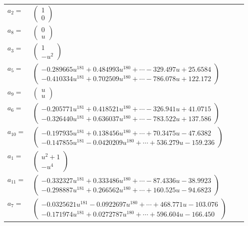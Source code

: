 \documentclass[1p]{elsarticle_modified}
\theoremstyle{definition}
\begin{document}
\begin{tabular}{m{7pt} m{180pt} m{7pt} m{180pt} }
\flushright $a_{2}=$&$\begin{pmatrix}1\\0\end{pmatrix}$ \\
\flushright $a_{8}=$&$\begin{pmatrix}0\\u\end{pmatrix}$ \\
\flushright $a_{3}=$&$\begin{pmatrix}1\\- u^2\end{pmatrix}$ \\
\flushright $a_{5}=$&$\begin{pmatrix}-0.289665 u^{181}+0.484993 u^{180}+\cdots-329.497 u+25.6584\\-0.410334 u^{181}+0.702509 u^{180}+\cdots-786.078 u+122.172\end{pmatrix}$ \\
\flushright $a_{9}=$&$\begin{pmatrix}u\\u\end{pmatrix}$ \\
\flushright $a_{6}=$&$\begin{pmatrix}-0.205771 u^{181}+0.418521 u^{180}+\cdots-326.941 u+41.0715\\-0.326440 u^{181}+0.636037 u^{180}+\cdots-783.522 u+137.586\end{pmatrix}$ \\
\flushright $a_{10}=$&$\begin{pmatrix}-0.197935 u^{181}+0.138456 u^{180}+\cdots+70.3475 u-47.6382\\-0.147855 u^{181}-0.0420209 u^{180}+\cdots+536.279 u-159.236\end{pmatrix}$ \\
\flushright $a_{1}=$&$\begin{pmatrix}u^2+1\\- u^4\end{pmatrix}$ \\
\flushright $a_{11}=$&$\begin{pmatrix}-0.332327 u^{181}+0.333486 u^{180}+\cdots-87.4336 u-38.9923\\-0.298887 u^{181}+0.266562 u^{180}+\cdots+160.525 u-94.6823\end{pmatrix}$ \\
\flushright $a_{7}=$&$\begin{pmatrix}-0.0325621 u^{181}-0.0922697 u^{180}+\cdots+468.771 u-103.076\\-0.171974 u^{181}+0.0272787 u^{180}+\cdots+596.604 u-166.450\end{pmatrix}$ \\

\end{tabular}
\end{document}
